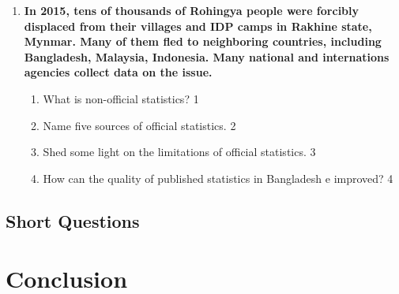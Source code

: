 \documentclass[a4paper,oneside]{book}
\begin{document}
  \begin{enumerate}
 \item
	  \textbf{In 2015, tens of thousands of Rohingya people were forcibly displaced from their villages and IDP camps in Rakhine state, Mynmar. Many of them fled to neighboring countries, including Bangladesh, Malaysia, Indonesia. Many national and internations agencies collect data on the issue.} 
  
  \begin{enumerate}
    \item
	What is non-official statistics? \hfill 1
    \item
	Name five sources of official statistics. \hfill 2
    \item  
	Shed some light on the limitations of official statistics. \hfill 3
    \item
	How can the quality of published statistics in Bangladesh e improved? \hfill 4
  \end{enumerate}
 \end{enumerate}
\section{Short Questions}

\backmatter
\chapter{Conclusion}
\lipsum[8]

\tableofcontents
\end{document}
